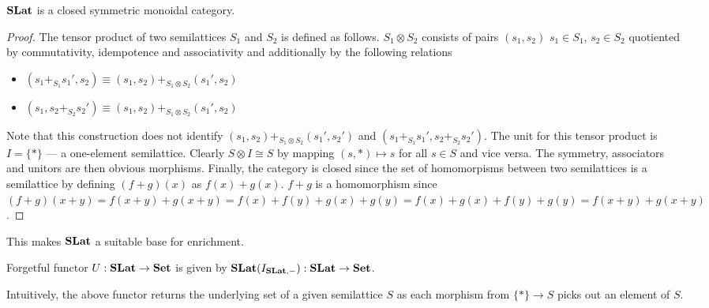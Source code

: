   \begin{proposition}
    $\mathbf{SLat}$ is a closed symmetric monoidal category.
  \end{proposition}
  \begin{proof}
    The tensor product of two semilattices $S_{1}$ and $S_{2}$ is defined as follows.
    $S_{1} \otimes S_{2}$ consists of pairs $(s_1,s_2)$ $s_{1} \in S_{1}$, $s_{2} \in S_{2}$ quotiented by commutativity, idempotence and associativity and additionally by the following relations
    \begin{itemize}
      \item $(s_{1} +_{S_{1}} s_{1}',s_{2}) \equiv (s_{1},s_{2}) +_{S_{1} \otimes S_{2}} (s_{1}',s_{2})$
      \item $(s_{1}, s_{2} +_{S_{2}} s_{2}') \equiv (s_{1},s_{2}) +_{S_{1} \otimes S_{2}} (s_{1}',s_{2})$
    \end{itemize}
  
    Note that this construction does not identify $(s_1,s_2) +_{S_1 \otimes S_2} (s_1',s_2')$ and $(s_1 +_{S_1} s_1', s_2 +_{S_2} s_2')$.
    The unit for this tensor product is $I = \{*\}$ --- a one-element semilattice.
    Clearly $S \otimes I \cong S$ by mapping $(s,*) \mapsto s$ for all $s \in S$ and vice versa.
    The symmetry, associators and unitors are then obvious morphisms.
    Finally, the category is closed since the set of homomorpisms between two semilattices is a semilattice by defining $(f + g)(x)$ as $f(x) + g(x)$.
    $f + g$ is a homomorphism since $(f + g)(x+y) = f(x+y) + g(x+y) = f(x) + f(y) + g(x) + g(y) = f(x) + g(x) + f(y) + g(y) = f(x+y) + g(x+y)$.
  \end{proof}
  
  This makes $\mathbf{SLat}$ a suitable base for enrichment.

  \begin{definition}
    Forgetful functor $U : \mathbf{SLat} \to \mathbf{Set}$ is given by $\mathbf{SLat}(I_{\mathbf{SLat}, -}) : \mathbf{SLat} \to \mathbf{Set}$.
    \end{definition}
    
    Intuitively, the above functor returns the underlying set of a given semilattice $S$ as each morphism from $\{*\} \to S$ picks out an element of $S$.
    
